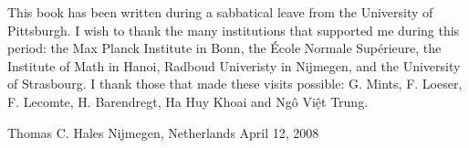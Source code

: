 This book has been written during a sabbatical leave from the University
of Pittsburgh.  I wish to thank the many institutions that supported
me during this period: the Max Planck Institute in Bonn, the \'Ecole Normale Sup\'erieure,  the Institute of Math
in Hanoi, Radboud Univeristy in Nijmegen, and the University of Strasbourg.
I thank those that made these visits possible: G. Mints, F. Loeser, F. Lecomte, H. Barendregt, Ha Huy Khoai and Ng\^o Vi\d{\^e}t Trung.


\bigskip
\hbox{}

{
\parindent=0pt
\obeylines

Thomas C. Hales
Nijmegen, Netherlands
April 12, 2008

}







